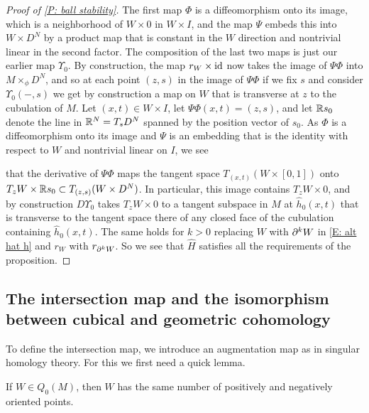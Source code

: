 \begin{proof}[Proof of \cref{P: ball stability}]
	The first map $\Phi$ is a diffeomorphism onto its image, which is a neighborhood of $W \times 0$ in $W \times I$, and the map $\Psi$ embeds this into $W \times D^N$ by a product map that is constant in the $W$ direction and nontrivial linear in the second factor.
	The composition of the last two maps is just our earlier map $\Upsilon_0$.
	By construction, the map $r_W \times \mathrm{id}$ now takes the image of $\Psi\Phi$ into $M\times_\phi D^N$, and so at each point $(z,s)$ in the image of $\Psi\Phi$ if we fix $s$ and consider $\Upsilon_0(-,s)$ we get by construction a map on $W$ that is transverse at $z$ to the cubulation of $M$.
	Let $(x,t) \in W \times I$, let $\Psi \Phi(x,t) = (z,s)$, and let $\mathbb{R} s_0$ denote the line in $\mathbb{R}^N = T_sD^N$ spanned by the position vector of $s_0$.
	As $\Phi$ is a diffeomorphism onto its image and $\Psi$ is an embedding that is the identity with respect to $W$ and nontrivial linear on $I$, we see
	\begin{comment}
		$\Psi\Phi$ takes a neighborhood of any $(x,t) \in W \times [0,1]$ to a neighborhood of its image in $W \times \R s_0$, where $\R s_0$ is the line in $\R^N$ spanned by $s_0$.
	\end{comment}
	that the derivative of $\Psi\Phi$ maps the tangent space $T_{(x,t)}(W \times [0,1])$ onto $ T_zW \times \mathbb{R} s_0 \subset T_{(z,s)}(W \times D^N)$.
	In particular, this image contains $T_zW \times 0$, and by construction $D\Upsilon_0$ takes $T_zW \times 0$ to a tangent subspace in $M$ at $\hat h_0(x,t)$ that is transverse to the tangent space there of any closed face of the cubulation containing $\hat h_0(x,t)$.
	The same holds for $k>0$ replacing $W$ with $\partial^{k}W$ in \eqref{E: alt hat h} and $r_W$ with $r_{\partial^{k}W}$.
	So we see that $\hat H$ satisfies all the requirements of the proposition.
\end{proof}

\subsection{The intersection map and the isomorphism between cubical and geometric cohomology}\label{S: intersection map}

To define the intersection map, we introduce an augmentation map as in singular homology theory.
For this we first need a quick lemma.

\begin{lemma}\label{L: Q0}
	If $W \in Q_0(M)$, then $W$ has the same number of positively and negatively oriented points.
\end{lemma}

